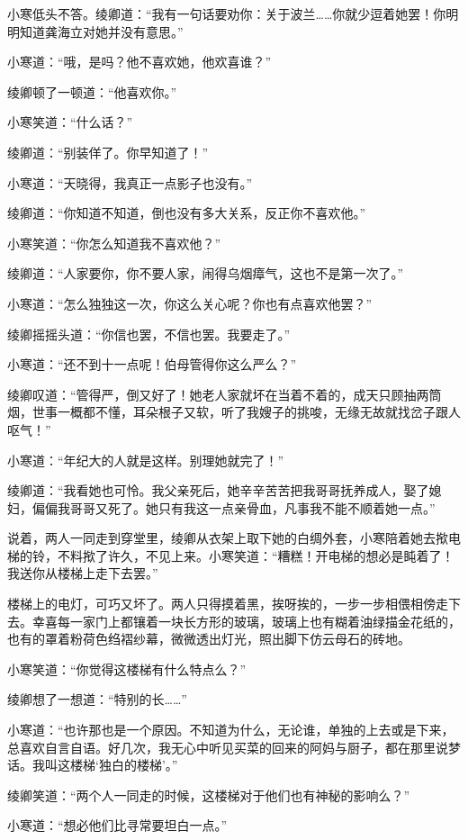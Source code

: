 \par 小寒低头不答。绫卿道：“我有一句话要劝你：关于波兰……你就少逗着她罢！你明明知道龚海立对她并没有意思。”
\par 小寒道：“哦，是吗？他不喜欢她，他欢喜谁？”
\par 绫卿顿了一顿道：“他喜欢你。”
\par 小寒笑道：“什么话？”
\par 绫卿道：“别装佯了。你早知道了！”
\par 小寒道：“天晓得，我真正一点影子也没有。”
\par 绫卿道：“你知道不知道，倒也没有多大关系，反正你不喜欢他。”
\par 小寒笑道：“你怎么知道我不喜欢他？”
\par 绫卿道：“人家要你，你不要人家，闹得乌烟瘴气，这也不是第一次了。”
\par 小寒道：“怎么独独这一次，你这么关心呢？你也有点喜欢他罢？”
\par 绫卿摇摇头道：“你信也罢，不信也罢。我要走了。”
\par 小寒道：“还不到十一点呢！伯母管得你这么严么？”
\par 绫卿叹道：“管得严，倒又好了！她老人家就坏在当着不着的，成天只顾抽两筒烟，世事一概都不懂，耳朵根子又软，听了我嫂子的挑唆，无缘无故就找岔子跟人呕气！”
\par 小寒道：“年纪大的人就是这样。别理她就完了！”
\par 绫卿道：“我看她也可怜。我父亲死后，她辛辛苦苦把我哥哥抚养成人，娶了媳妇，偏偏我哥哥又死了。她只有我这一点亲骨血，凡事我不能不顺着她一点。”
\par 说着，两人一同走到穿堂里，绫卿从衣架上取下她的白绸外套，小寒陪着她去揿电梯的铃，不料揿了许久，不见上来。小寒笑道：“糟糕！开电梯的想必是盹着了！我送你从楼梯上走下去罢。”
\par 楼梯上的电灯，可巧又坏了。两人只得摸着黑，挨呀挨的，一步一步相偎相傍走下去。幸喜每一家门上都镶着一块长方形的玻璃，玻璃上也有糊着油绿描金花纸的，也有的罩着粉荷色绉褶纱幕，微微透出灯光，照出脚下仿云母石的砖地。
\par 小寒笑道：“你觉得这楼梯有什么特点么？”
\par 绫卿想了一想道：“特别的长……”
\par 小寒道：“也许那也是一个原因。不知道为什么，无论谁，单独的上去或是下来，总喜欢自言自语。好几次，我无心中听见买菜的回来的阿妈与厨子，都在那里说梦话。我叫这楼梯‘独白的楼梯’。”
\par 绫卿笑道：“两个人一同走的时候，这楼梯对于他们也有神秘的影响么？”
\par 小寒道：“想必他们比寻常要坦白一点。”
